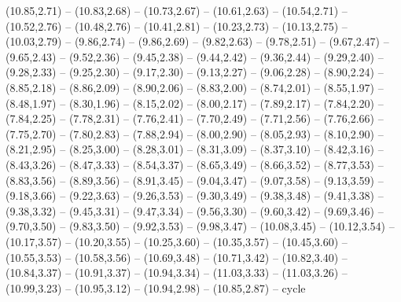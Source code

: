 \expandafter\def\csname geo:gebiet:heute-SVK\endcsname{
  (10.85,2.71) -- (10.83,2.68) -- (10.73,2.67) -- (10.61,2.63) -- (10.54,2.71) -- (10.52,2.76) -- (10.48,2.76) -- (10.41,2.81) -- (10.23,2.73) -- (10.13,2.75) -- (10.03,2.79) -- (9.86,2.74) -- (9.86,2.69) -- (9.82,2.63) -- (9.78,2.51) -- (9.67,2.47) -- (9.65,2.43) -- (9.52,2.36) -- (9.45,2.38) -- (9.44,2.42) -- (9.36,2.44) -- (9.29,2.40) -- (9.28,2.33) -- (9.25,2.30) -- (9.17,2.30) -- (9.13,2.27) -- (9.06,2.28) -- (8.90,2.24) -- (8.85,2.18) -- (8.86,2.09) -- (8.90,2.06) -- (8.83,2.00) -- (8.74,2.01) -- (8.55,1.97) -- (8.48,1.97) -- (8.30,1.96) -- (8.15,2.02) -- (8.00,2.17) -- (7.89,2.17) -- (7.84,2.20) -- (7.84,2.25) -- (7.78,2.31) -- (7.76,2.41) -- (7.70,2.49) -- (7.71,2.56) -- (7.76,2.66) -- (7.75,2.70) -- (7.80,2.83) -- (7.88,2.94) -- (8.00,2.90) -- (8.05,2.93) -- (8.10,2.90) -- (8.21,2.95) -- (8.25,3.00) -- (8.28,3.01) -- (8.31,3.09) -- (8.37,3.10) -- (8.42,3.16) -- (8.43,3.26) -- (8.47,3.33) -- (8.54,3.37) -- (8.65,3.49) -- (8.66,3.52) -- (8.77,3.53) -- (8.83,3.56) -- (8.89,3.56) -- (8.91,3.45) -- (9.04,3.47) -- (9.07,3.58) -- (9.13,3.59) -- (9.18,3.66) -- (9.22,3.63) -- (9.26,3.53) -- (9.30,3.49) -- (9.38,3.48) -- (9.41,3.38) -- (9.38,3.32) -- (9.45,3.31) -- (9.47,3.34) -- (9.56,3.30) -- (9.60,3.42) -- (9.69,3.46) -- (9.70,3.50) -- (9.83,3.50) -- (9.92,3.53) -- (9.98,3.47) -- (10.08,3.45) -- (10.12,3.54) -- (10.17,3.57) -- (10.20,3.55) -- (10.25,3.60) -- (10.35,3.57) -- (10.45,3.60) -- (10.55,3.53) -- (10.58,3.56) -- (10.69,3.48) -- (10.71,3.42) -- (10.82,3.40) -- (10.84,3.37) -- (10.91,3.37) -- (10.94,3.34) -- (11.03,3.33) -- (11.03,3.26) -- (10.99,3.23) -- (10.95,3.12) -- (10.94,2.98) -- (10.85,2.87) -- cycle}
